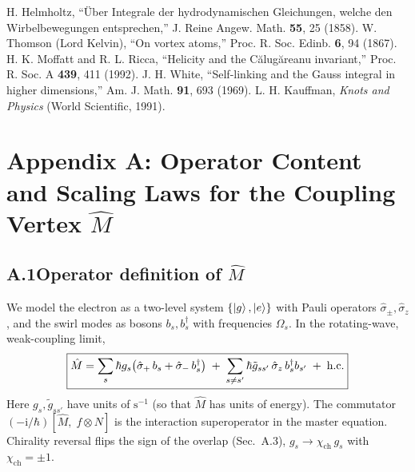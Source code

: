 \documentclass[aps,prb,preprint,amsmath,amssymb]{revtex4-2} %
\begin{document}
\begin{thebibliography}{99}
            H. Helmholtz, ``Über Integrale der hydrodynamischen Gleichungen, welche den Wirbelbewegungen entsprechen,'' J. Reine Angew. Math. \textbf{55}, 25 (1858).
            W. Thomson (Lord Kelvin), ``On vortex atoms,'' Proc. R. Soc. Edinb. \textbf{6}, 94 (1867).
            H. K. Moffatt and R. L. Ricca, ``Helicity and the Călugăreanu invariant,'' Proc. R. Soc. A \textbf{439}, 411 (1992).
            J. H. White, ``Self-linking and the Gauss integral in higher dimensions,'' Am. J. Math. \textbf{91}, 693 (1969).
            L. H. Kauffman, \textit{Knots and Physics} (World Scientific, 1991).
        \end{thebibliography}


\appendix
    \section*{Appendix A: Operator Content and Scaling Laws for the Coupling Vertex \texorpdfstring{$\hat M$}{M}}

    \newcommand{\OmegaZero}{\Omega_{0}}
    \newcommand{\EE}{\mathrm{e}}
    \newcommand{\ii}{\mathrm{i}}
    \newcommand{\dd}{\mathrm{d}}

    \newcommand{\cVal}{2.99792458\times10^{8}}        %
    \newcommand{\hbarVal}{1.054571817\times10^{-34}}  %


    \subsection*{A.1\quad Operator definition of \texorpdfstring{$\hat M$}{M}}
        We model the electron as a two-level system \(\{\ket{g},\ket{e}\}\) with Pauli operators \(\hat\sigma_\pm,\hat\sigma_z\), and the swirl modes as bosons \(b_s,b_s^\dagger\) with frequencies \(\Omega_s\). In the rotating-wave, weak-coupling limit,
        \begin{align}
            \boxed{%
                \hat M
                = \sum_{s}\hbar g_s\!\left(\hat\sigma_{+}\,b_s+\hat\sigma_{-}\,b_s^\dagger\right)
                \;+\; \sum_{s\neq s'} \hbar \tilde g_{ss'}\,\hat\sigma_z\, b_s^\dagger b_{s'} \;+\; \text{h.c.}
            }
            \label{eq:M-operator}
        \end{align}
        Here \(g_s,\tilde g_{ss'}\) have units of \(\mathrm{s^{-1}}\) (so that \(\hat M\) has units of energy). The commutator \(({-}\ii/\hbar)[\hat M,\;f\!\otimes\!N]\) is the interaction superoperator in the master equation. Chirality reversal flips the sign of the overlap (Sec.~A.3), \(g_s\to \chi_\mathrm{ch}\,g_s\) with \(\chi_\mathrm{ch}=\pm1\).
\end{document}
